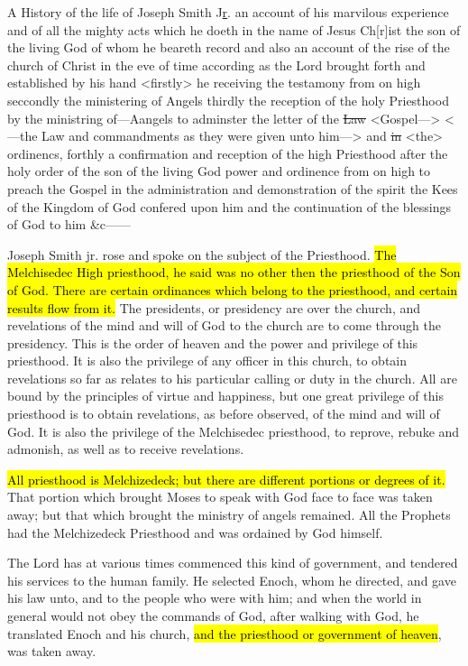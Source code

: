 		\begin{compactdesc}
			\item[{\hyperref[EMS-1832-JS-CIR-SUM-1832]{Circa Summer 1832}}] A History of the life of Joseph Smith J\uline{r}. an account of his marvilous experience and of all the mighty acts which he doeth in the name of Jesus Ch[r]ist the son of the living God of whom he beareth record and also an account of the rise of the church of Christ in the eve of time according as the Lord brought forth and established by his hand <firstly> he receiving the testamony from on high seccondly the ministering of Angels thirdly the reception of the holy Priesthood by the ministring of---Aangels to adminster the letter of the \sout{Law} <Gospel---> <---the Law and commandments as they were given unto him---> and \sout{in} <the> ordinencs, forthly a confirmation and reception of the high Priesthood after the holy order of the son of the living God power and ordinence from on high to preach the Gospel in the administration and demonstration of the spirit the Kees of the Kingdom of God confered upon him and the continuation of the blessings of God to him \&c------
			\item[{\hyperref[EMS-1837-JS-6-APR-1837]{6 April 1837}}] Joseph Smith jr. rose and spoke on the subject of the Priesthood. \hl{The Melchisedec High priesthood, he said was no other then the priesthood of the Son of God. There are certain ordinances which belong to the priesthood, and certain results flow from it.} The presidents, or presidency are over the church, and revelations of the mind and will of God to the church are to come through the presidency. This is the order of heaven and the power and privilege of this priesthood. It is also the privilege of any officer in this church, to obtain revelations so far as relates to his particular calling or duty in the church. All are bound by the principles of virtue and happiness, but one great privilege of this priesthood is to obtain revelations, as before observed, of the mind and will of God. It is also the privilege of the Melchisedec priesthood, to reprove, rebuke and admonish, as well as to receive revelations.
			\item[{\hyperref[EMS-1841-JS-5-JAN-1841-WC]{5 January 1841}}] \hl{All priesthood is Melchizedeck; but there are different portions or degrees of it.} That portion which brought Moses to speak with God face to face was taken away; but that which brought the ministry of angels remained. All the Prophets had the Melchizedeck Priesthood and was ordained by God himself.
			\item[{\hyperref[EMS-1842-JS-15-JUL-1842-A]{15 July 1842}}] The Lord has at various times commenced this kind of government, and tendered his services to the human family. He selected Enoch, whom he directed, and gave his law unto, and to the people who were with him; and when the world in general would not obey the commands of God, after walking with God, he translated Enoch and his church, \hl{and the priesthood or government of heaven}, was taken away.

\end{compactdesc}
